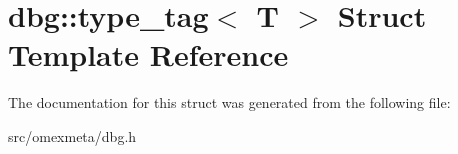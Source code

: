 \hypertarget{structdbg_1_1type__tag}{}\section{dbg\+:\+:type\+\_\+tag$<$ T $>$ Struct Template Reference}
\label{structdbg_1_1type__tag}


The documentation for this struct was generated from the following file\+:\begin{DoxyCompactItemize}
\item 
src/omexmeta/dbg.\+h\end{DoxyCompactItemize}
